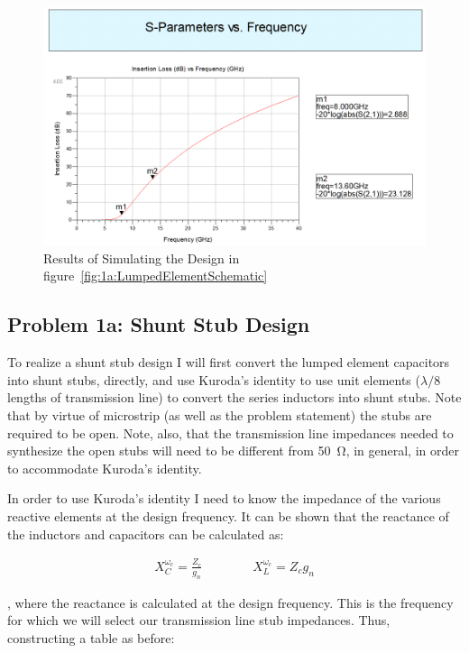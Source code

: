     \begin{figure}[H]
        \centering
        \includegraphics[width=0.8\linewidth]{img/Problem1/LumpedElementResults.PNG}
        \caption{Results of Simulating the Design in
        figure~\ref{fig:1a:LumpedElementSchematic}}
        \label{fig:imgLumpedElementResults}
    \end{figure}

    \subsection*{Problem 1a: Shunt Stub Design}

    To realize a shunt stub design I will first convert the lumped element
    capacitors into shunt stubs, directly, and use Kuroda's identity to use unit
    elements ($\lambda/8$ lengths of transmission line) to convert the series
    inductors into shunt stubs. Note that by virtue of microstrip (as well as
    the problem statement) the stubs are required to be open. Note, also, that
    the transmission line impedances needed to synthesize the open stubs will
    need to be different from \SI{50}{\ohm}, in general, in order to accommodate
    Kuroda's identity.

    In order to use Kuroda's identity I need to know the impedance of the
    various reactive elements at the design frequency. It can be shown that
    the reactance of the inductors and capacitors can be calculated as:

    \begin{align*}
        X_C^{\omega_c} = \frac{Z_c}{g_n} \quad\quad\quad\quad X_L^{\omega_c} = Z_c g_n	
    \end{align*}

    , where the reactance is calculated at the design frequency. This is the
    frequency for which we will select our transmission line stub
    impedances. Thus, constructing a table as before:

